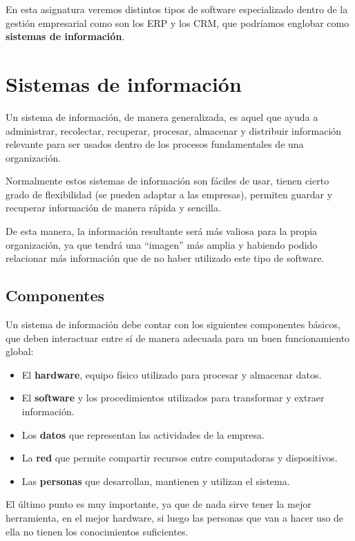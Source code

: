 En esta asignatura veremos distintos tipos de software especializado dentro de la gestión empresarial como son los ERP y los CRM, que podríamos englobar como \textbf{sistemas de información}.

\chapter{Sistemas de información}

Un sistema de información, de manera generalizada, es aquel que ayuda a administrar, recolectar, recuperar, procesar, almacenar y distribuir información relevante para ser usados dentro de los procesos fundamentales de una organización.

Normalmente estos sistemas de información son fáciles de usar, tienen cierto grado de flexibilidad (se pueden adaptar a las empresas), permiten guardar y recuperar información de manera rápida y sencilla.

De esta manera, la información resultante será más valiosa para la propia organización, ya que tendrá una “imagen” más amplia y habiendo podido relacionar más información que de no haber utilizado este tipo de software.

\section{Componentes}
Un sistema de información debe contar con los siguientes componentes básicos, que deben interactuar entre sí de manera adecuada para un buen funcionamiento global:
\begin{itemize}
    \item El \textbf{hardware}, equipo físico utilizado para procesar y almacenar datos.
    \item El \textbf{software} y los procedimientos utilizados para transformar y extraer información.
    \item Los \textbf{datos} que representan las actividades de la empresa.
    \item La \textbf{red} que permite compartir recursos entre computadoras y dispositivos.
    \item Las \textbf{personas} que desarrollan, mantienen y utilizan el sistema.
\end{itemize}

El último punto es muy importante, ya que de nada sirve tener la mejor herramienta, en el mejor hardware, si luego las personas que van a hacer uso de ella no tienen los conocimientos suficientes.

